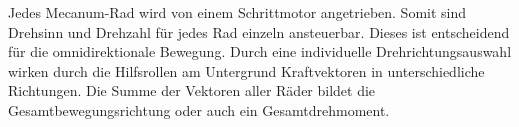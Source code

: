 Jedes Mecanum-Rad wird von einem Schrittmotor angetrieben. Somit sind Drehsinn und Drehzahl für jedes Rad einzeln ansteuerbar. Dieses ist entscheidend für die omnidirektionale Bewegung.
Durch eine individuelle Drehrichtungsauswahl wirken durch die Hilfsrollen am Untergrund Kraftvektoren in unterschiedliche Richtungen. Die Summe der Vektoren aller Räder bildet die Gesamtbewegungsrichtung oder auch ein Gesamtdrehmoment.





















